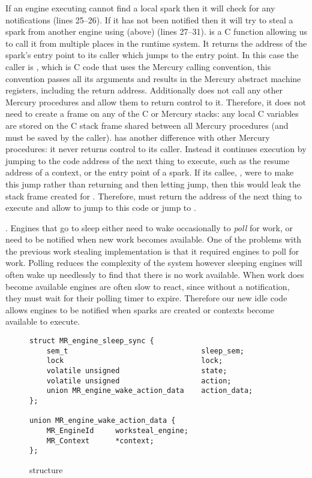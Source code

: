 If an engine executing \idle cannot find a local spark then it will
check for any notifications (lines 25--26).
If it has not been notified then it will try to steal a spark from another
engine using \trystealspark (above) (lines 27--31).
\trystealspark is a C function allowing us to call it from multiple places
in the runtime system.
It returns the address of the spark's entry point to its caller which jumps
to the entry point.
In this case the caller is \idle,
which is C code that uses the Mercury calling convention,
this convention passes all its arguments and results in the Mercury abstract
machine registers, including the return address.
Additionally \idle does not call any other Mercury procedures and allow them
to return control to it.
Therefore, it does not need to create a frame on any of the C or Mercury stacks:
any local C variables are stored on the C stack frame shared between all
Mercury procedures (and must be saved by the caller).
\idle has another difference with other Mercury procedures:
it never returns control to its caller.
Instead it continues execution by jumping to the code address of the next
thing to execute,
such as the resume address of a context,
or the entry point of a spark.
If its callee, \trystealspark, were to make this jump rather than
returning and then letting \idle jump,
then this would leak the stack frame created for \trystealspark.
Therefore, \trystealspark must return the address of the next thing to
execute and allow \idle to jump to this code or jump to \sleep.

.
Engines that go to sleep either need to wake occasionally to \emph{poll} for
work,
or need to be notified when new work becomes available.
One of the problems with the previous work stealing implementation is
that it required engines to poll for work.
Polling reduces the complexity of the system however
sleeping engines will often wake up needlessly to find that there is no
work available.
When work does become available engines are often slow to react,
since without a notification, they must wait for their polling timer to
expire.
Therefore our new idle code allows engines to be notified when 
sparks are created or contexts become available to execute.

\begin{figure}
\begin{verbatim}
struct MR_engine_sleep_sync {
    sem_t                               sleep_sem;
    lock                                lock;
    volatile unsigned                   state;
    volatile unsigned                   action;
    union MR_engine_wake_action_data    action_data;
};

union MR_engine_wake_action_data {
    MR_EngineId     worksteal_engine;
    MR_Context      *context;
};
\end{verbatim}
\caption{\enginesleepsync structure}
\label{fig:engine_sleep_sync}
\end{figure}

